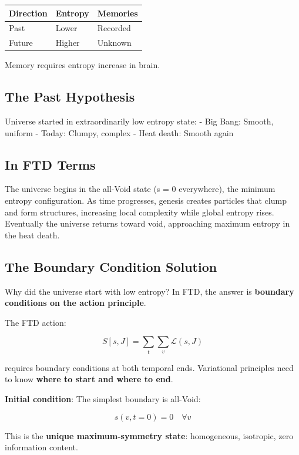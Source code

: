 \documentclass[
  11pt,
  letterpaper,
  twoside,
  openright]{book}
\begin{document}
\begin{longtable}[]{@{}lll@{}}
\toprule\noalign{}
Direction & Entropy & Memories \\
\midrule\noalign{}
\endhead
\bottomrule\noalign{}
\endlastfoot
Past & Lower & Recorded \\
Future & Higher & Unknown \\
\end{longtable}

Memory requires entropy increase in brain.

\subsection{The Past Hypothesis}\label{the-past-hypothesis}

Universe started in extraordinarily low entropy state: - Big Bang:
Smooth, uniform - Today: Clumpy, complex - Heat death: Smooth again

\subsection{In FTD Terms}\label{in-ftd-terms}

The universe begins in the all-Void state (s = 0 everywhere), the
minimum entropy configuration. As time progresses, genesis creates
particles that clump and form structures, increasing local complexity
while global entropy rises. Eventually the universe returns toward void,
approaching maximum entropy in the heat death.

\subsection{The Boundary Condition
Solution}\label{the-boundary-condition-solution}

Why did the universe start with low entropy? In FTD, the answer is
\textbf{boundary conditions on the action principle}.

The FTD action:

\[S[s,J] = \sum_t \sum_v \mathcal{L}(s,J)\]

requires boundary conditions at both temporal ends. Variational
principles need to know \textbf{where to start and where to end}.

\textbf{Initial condition}: The simplest boundary is all-Void:

\[s(v, t=0) = 0 \quad \forall v\]

This is the \textbf{unique maximum-symmetry state}: homogeneous,
isotropic, zero information content.
\end{document}
